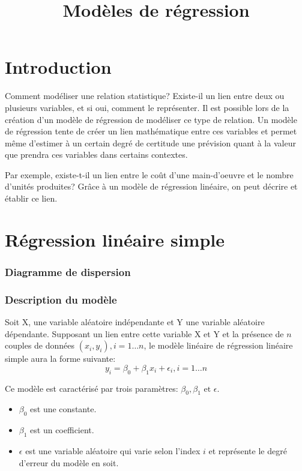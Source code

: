 \documentclass[12pt]{book}
\title{Modèles de régression}
\theoremstyle{definition}
\begin{document}
\chapter{Introduction}
Comment modéliser une relation statistique? Existe-il un lien entre deux ou plusieurs variables, et si oui, comment
le représenter. Il est possible lors de la création d'un modèle de régression de modéliser ce type de relation. Un modèle de régression tente de créer un lien mathématique entre ces 
variables et permet même d'estimer à un certain degré de certitude une prévision quant à la valeur que prendra ces 
variables dans certains contextes.

Par exemple, existe-t-il un lien entre le coût d'une main-d'oeuvre et le nombre d'unités produites? Grâce à un modèle de régression
linéaire, on peut décrire et établir ce lien.

\chapter{Régression linéaire simple}
\subsection{Diagramme de dispersion}
\subsection{Description du modèle}
Soit X, une variable aléatoire indépendante et Y une variable aléatoire dépendante. Supposant un lien entre cette variable X et Y 
et la présence de $n$ couples de données $(x_i, y_i), i=1 \dots n$, le modèle linéaire de régression linéaire simple aura la forme 
suivante:
$$ y_i = \beta_0 + \beta_1 x_i + \epsilon_i, i=1 \dots n $$ 


Ce modèle est caractérisé par trois paramètres: $\beta_0, \beta_1 \text{ et } \epsilon$.

\begin{itemize}
    \item $\beta_0$ est une constante.
    \item $\beta_1$ est un coefficient.
    \item $\epsilon$ est une variable aléatoire qui varie selon l'index $i$ et représente le degré d'erreur du modèle en soit.
\end{itemize}
\end{document}
